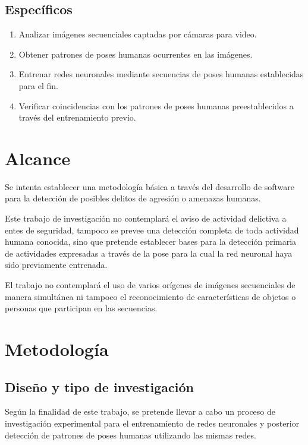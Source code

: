 \documentclass[a4paper,12pt,oneside,spanish]{book}
\begin{document}
\subsection{Específicos}
\begin{enumerate}
	\baselineskip 16pt
	\item Analizar imágenes secuenciales captadas por cámaras para video.\par 
	\item Obtener patrones de poses humanas ocurrentes en las imágenes.\par 
	\item Entrenar redes neuronales mediante secuencias de poses humanas establecidas para el fin.\par 
	\item Verificar coincidencias con los patrones de poses humanas preestablecidos a través del entrenamiento previo.\par 
\end{enumerate}

\section{Alcance}
Se intenta establecer una metodología básica a través del desarrollo de software para la detección de posibles delitos de agresión o amenazas humanas.\par

Este trabajo de investigación no contemplará el aviso de actividad delictiva a entes de seguridad, tampoco se prevee una detección completa de toda actividad humana conocida, sino que pretende establecer bases para la detección primaria de  actividades expresadas a través de la pose para la cual la red neuronal haya sido previamente entrenada.\par

El trabajo no contemplará el uso de varios orígenes de imágenes secuenciales de manera simultánea ni tampoco el reconocimiento de características de objetos o personas que participan en las secuencias.\par

\section{Metodología}
\subsection{Diseño y tipo de investigación}
Según la finalidad de este trabajo, se pretende llevar a cabo un proceso de investigación experimental para el entrenamiento de redes neuronales y posterior detección de patrones de poses humanas utilizando las mismas redes.
\par
\end{document}
